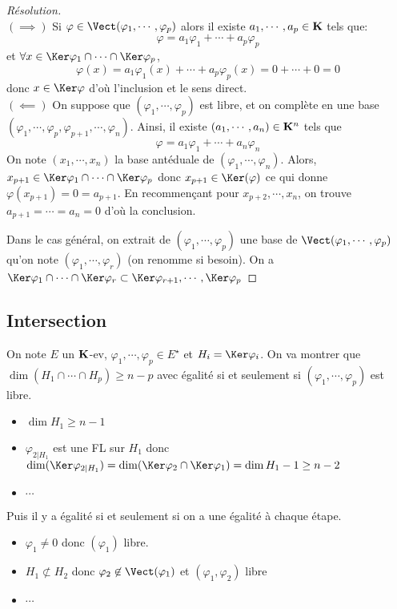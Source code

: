 \begin{proof}[Résolution] ~\\
    $(\implies )$ Si $\varphi \in \Vect(\varphi_1,\cdots,\varphi_p)$ alors il existe $a_1,\cdots,a_p\in \mathbf K$ tels que:
    \[ \varphi = a_1 \varphi_1 + \cdots + a_p \varphi_p \]
    et $\forall x \in \Ker \varphi_1 \cap\cdots \cap \Ker \varphi_p$,
    \[
        \varphi(x) = a_1 \varphi_1(x) + \cdots + a_p \varphi_p(x)
                = 0 + \cdots + 0 = 0 
            \]
    donc $x \in \Ker \varphi$ d'où l'inclusion et le sens direct. \\
    $(\impliedby )$
    On suppose que $(\varphi_1,\cdots,\varphi_p)$ est libre, et on complète en une base $(\varphi_1,\cdots,\varphi_p,\varphi_{p+1},\cdots,\varphi_n)$.  Ainsi, il existe $(a_1,\cdots,a_n)\in \mathbf K^n$ tels que 
    \[ \varphi = a_1 \varphi_1 + \cdots + a_n \varphi_n  \]
    On note $(x_1,\cdots,x_n)$ la base antéduale de $(\varphi_1, \cdots , \varphi_n)$. Alors, $x_{p+1} \in \Ker \varphi_1 \cap\cdots \cap \Ker \varphi_p$ donc $x_{p+1} \in \Ker(\varphi)$ ce qui donne $\varphi(x_{p+1}) = 0 = a_{p+1}$.
    En recommençant  pour $x_{p+2},\cdots,x_{n}$, on trouve $a_{p+1}=\cdots=a_n=0$ d'où la conclusion.
    
    Dans le cas général, on extrait de $(\varphi_1, \cdots , \varphi_p)$ une base de $\Vect(\varphi_1, \cdots , \varphi_p)$ qu'on note $(\varphi_1, \cdots , \varphi_r)$ (on renomme si besoin). On a $\Ker\varphi_1\cap \cdots\cap \Ker \varphi_r\subset \Ker \varphi_{r+1},\cdots ,\Ker\varphi_p$

\end{proof}

\subsection{Intersection}

On note $E$ un $ \mathbf K$-ev, $\varphi_1,\cdots,\varphi_p\in E^\star$ et $H_i = \Ker \varphi_i$.  On va montrer que $\dim(H_1\cap\cdots\cap H_p)\geq n-p$ avec égalité si et seulement si $(\varphi_1,\cdots,\varphi_p)$ est libre. \begin{itemize}
    \item $\dim H_1 \geq  n-1$
    \item $\varphi_{2|H_1}$ est une FL sur $H_1$ donc  $\dim(\Ker \varphi_{2|H_1})=\dim(\Ker \varphi_2\cap \Ker \varphi_1)=\dim H_1-1\geq n-2$
    \item $\cdots$
\end{itemize}
Puis il y a égalité si et seulement si on a une égalité à chaque étape.
\begin{itemize}
    \item $\varphi_1 \neq 0$ donc $(\varphi_1)$ libre.
    \item  $H_1\not\subset H_2$ donc  $\varphi_2 \not\in\Vect(\varphi_1)$ et  $(\varphi_1, \varphi_2)$ libre
    \item $\cdots $
\end{itemize}

